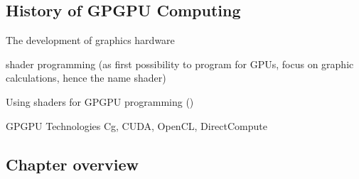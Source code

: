 \subsection{History of GPGPU Computing}
The development of graphics hardware

shader programming (as first possibility to program for GPUs, focus on graphic calculations, hence the name shader)

Using shaders for GPGPU programming ()

GPGPU Technologies
Cg, CUDA, OpenCL, DirectCompute

\subsection{Chapter overview}


